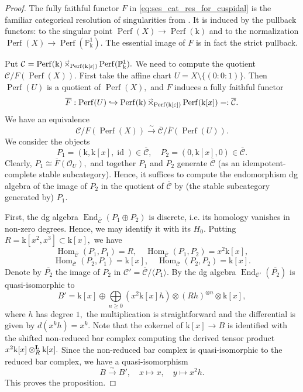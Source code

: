 \documentclass[11pt,leqno]{amsart}
\numberwithin{equation}{section}
\def\bL{\mathbb{L}}
\def\bL{{\mathbf L}}
\def\PP{{\mathbb P}}
\def\Hom{\operatorname{Hom}}
\def\End{\operatorname{End}}
\newcommand{\Ltens}[1]{%
  \mathbin{\mathop{\otimes}\displaylimits^{\bL}_{#1}}%
}
\newcommand{\laxtimes}[1]{\mathop{\times\mkern-13mu\raise1.3ex\hbox{$\scriptscriptstyle\to$}_{#1}}}
\newcommand{\biggplus}[1][]{\mathop{\bigoplus}\limits_{#1}}
\newcommand{\bbar}{\overline}
\newcommand{\xto}{\xrightarrow}
\newcommand{\hto}{\hookrightarrow}
\newcommand{\mk}{\mathrm k}
\newcommand{\cO}{{\mathcal O}}
\newcommand{\cC}{{\mathcal C}}
\newcommand{\veps}{\varepsilon}
\newcommand{\la}{\langle}
\newcommand{\ra}{\rangle}
\newcommand{\Perf}{\operatorname{Perf}}
\newcommand{\id}{\operatorname{id}}
\begin{document}
\begin{proof}
The fully faithful functor $F$ in \eqref{eq:ses_cat_res_for_cuspidal} is the familiar categorical resolution of singularities from \cite{KL15}. It is induced by the pullback functors: to the singular point $\Perf(X)\to\Perf(\mk)$ and to the normalization $\Perf(X)\to\Perf(\PP^1_{\mk}).$ The essential image of $F$ is in fact the strict pullback.

Put $\cC=\Perf(\mk)\laxtimes{\Perf(\mk[\veps])} \Perf(\PP^1_{\mk}).$ We need to compute the quotient $\cC/F(\Perf(X)).$ First take the affine chart $U=X\setminus\{(0:0:1)\}.$ Then $\Perf(U)$ is a quotient of $\Perf(X),$ and $F$ induces a fully faithful functor
\begin{equation*}
\bbar{F}:\Perf(U)\hto \Perf(\mk)\laxtimes{\Perf(\mk[\veps])} \Perf(\mk[x])=:\bbar{\cC}.
\end{equation*}
We have an equivalence
\begin{equation*}
\cC/F(\Perf(X))\xto{\sim}\bbar{\cC}/\bbar{F}(\Perf(U)).
\end{equation*}
We consider the objects
\begin{equation*}
P_1=(\mk,\mk[x],\id)\in\bbar{\cC},\quad P_2=(0,\mk[x],0)\in\bbar{\cC}.
\end{equation*}
Clearly, $P_1\cong \bbar{F}(\cO_U),$ and together $P_1$ and $P_2$ generate $\bbar{\cC}$ (as an idempotent-complete stable subcategory). Hence, it suffices to compute the endomorphism dg algebra of the image of $P_2$ in the quotient of $\bbar{\cC}$ by (the stable subcategory generated by) $P_1$. 

First, the dg algebra $\End_{\bbar{\cC}}(P_1\oplus P_2)$ is discrete, i.e. its homology vanishes in non-zero degrees. Hence, we may identify it with its $H_0.$ Putting $R=\mk[x^2,x^3]\subset\mk[x],$ we have
\begin{equation*}
\Hom_{\bbar{\cC}}(P_1,P_1)=R,\quad \Hom_{\bbar{\cC}}(P_1,P_2)=x^2\mk[x],
\end{equation*}
\begin{equation*}
\Hom_{\bbar{\cC}}(P_2,P_1)=\mk[x],\quad \Hom_{\bbar{\cC}}(P_2,P_2)=\mk[x].
\end{equation*}
Denote by $\bbar{P_2}$ the image of $P_2$ in $\cC'=\bbar{\cC}/\la P_1\ra.$ By \cite{Dr04} the dg algebra $\End_{\cC'}(\bbar{P_2})$ is quasi-isomorphic to
\begin{equation*}
B'=\mk[x]\oplus\biggplus[n\geq 0](x^2\mk[x]h)\otimes (R h)^{\otimes n}\otimes\mk[x],
\end{equation*}
where $h$ has degree $1,$ the multiplication is straightforward and the differential is given by $d(x^k h)=x^k.$ Note that the cokernel of $\mk[x]\to B$ is identified with the shifted non-reduced bar complex computing the derived tensor product $x^2\mk[x]\Ltens{R}\mk[x].$ Since the non-reduced bar complex is quasi-isomorphic to the reduced bar complex, we have a quasi-isomorphism
\begin{equation*}
B\xto{\sim} B',\quad x\mapsto x,\quad y\mapsto x^2 h.
\end{equation*}
This proves the proposition.
\end{proof}
\end{document}

